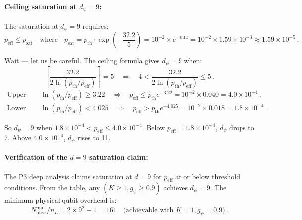 \documentclass[11pt]{article}
\theoremstyle{definition}
\theoremstyle{remark}
\begin{document}
\paragraph{Ceiling saturation at $d_\psi = 9$:}

The saturation at $d_\psi = 9$ requires:
\begin{equation}
p_{\mathrm{eff}} \leq p_{\mathrm{sat}} \quad\text{where}\quad
p_{\mathrm{sat}} = p_{\mathrm{th}} \cdot
\exp\!\left(-\frac{32.2}{5}\right)
= 10^{-2} \times e^{-6.44} = 10^{-2} \times 1.59\times 10^{-3}
\approx 1.59\times 10^{-5}\,.
\end{equation}

Wait --- let us be careful. The ceiling formula gives $d_\psi = 9$ when:
\begin{equation}
\left\lceil\frac{32.2}{2\ln(p_{\mathrm{th}}/p_{\mathrm{eff}})}\right\rceil = 5
\quad\Rightarrow\quad
4 < \frac{32.2}{2\ln(p_{\mathrm{th}}/p_{\mathrm{eff}})} \leq 5\,.
\end{equation}
\begin{align}
\text{Upper bound:}\quad & \ln(p_{\mathrm{th}}/p_{\mathrm{eff}}) \geq 3.22
\quad\Rightarrow\quad p_{\mathrm{eff}} \leq p_{\mathrm{th}} e^{-3.22}
= 10^{-2} \times 0.040 = 4.0\times 10^{-4}\,.\\
\text{Lower bound:}\quad & \ln(p_{\mathrm{th}}/p_{\mathrm{eff}}) < 4.025
\quad\Rightarrow\quad p_{\mathrm{eff}} > p_{\mathrm{th}} e^{-4.025}
= 10^{-2} \times 0.018 = 1.8\times 10^{-4}\,.
\end{align}

So $d_\psi = 9$ when $1.8\times 10^{-4} < p_{\mathrm{eff}} \leq 4.0\times
10^{-4}$. Below $p_{\mathrm{eff}} = 1.8\times 10^{-4}$, $d_\psi$ drops to 7.
Above $4.0\times 10^{-4}$, $d_\psi$ rises to 11.

\paragraph{Verification of the $d = 9$ saturation claim:}

The P3 deep analysis claims saturation at $d = 9$ for $p_{\mathrm{eff}}$ at
or below threshold conditions. From the table, any $(K \geq 1, g_\psi \geq 0.9)$
achieves $d_\psi = 9$. The minimum physical qubit overhead is:
\begin{equation}
\boxed{
N_{\mathrm{phys}}^{\min} / n_L = 2 \times 9^2 - 1 = 161 \quad
\text{(achievable with } K = 1, g_\psi = 0.9\text{)}\,.
}
\label{eq:nphys-min}
\end{equation}
\end{document}
